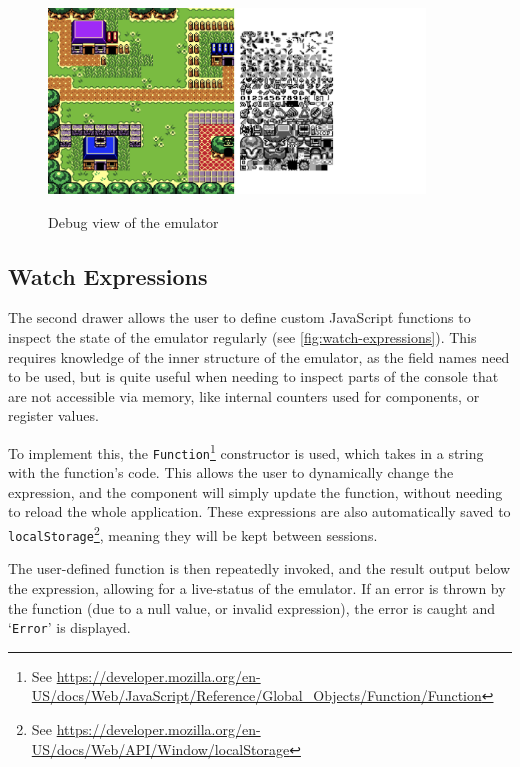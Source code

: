 \documentclass[11pt]{informatics-report}
\newcommand{\ftnt}[1]{\footnote{See \url{#1}}}
\begin{document}
\begin{figure}[h]
    \centering
    \includegraphics[width=10cm]{images/debug-view}\\
    \caption{Debug view of the emulator}
    \label{fig:debug-view}
\end{figure}

\subsection{Watch Expressions}

The second drawer allows the user to define custom JavaScript functions to inspect the state of the emulator regularly (see \ref{fig:watch-expressions}). This requires knowledge of the inner structure of the emulator, as the field names need to be used, but is quite useful when needing to inspect parts of the console that are not accessible via memory, like internal counters used for components, or register values.

To implement this, the \texttt{Function}\ftnt{https://developer.mozilla.org/en-US/docs/Web/JavaScript/Reference/Global_Objects/Function/Function} constructor is used, which takes in a string with the function's code. This allows the user to dynamically change the expression, and the component will simply update the function, without needing to reload the whole application. These expressions are also automatically saved to \texttt{localStorage}\ftnt{https://developer.mozilla.org/en-US/docs/Web/API/Window/localStorage}, meaning they will be kept between sessions.

The user-defined function is then repeatedly invoked, and the result output below the expression, allowing for a live-status of the emulator. If an error is thrown by the function (due to a null value, or invalid expression), the error is caught and `\texttt{Error}' is displayed.
\end{document}

